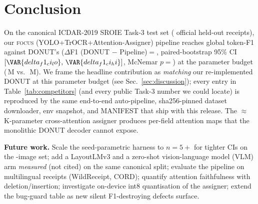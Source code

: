 \section{Conclusion}

On the canonical ICDAR-2019 SROIE Task-3 test set (
official held-out receipts), our \textsc{focus}
(YOLO+TrOCR+Attention-Assigner) pipeline reaches
 global token-F1 against
DONUT's 
($\Delta$F1 (DONUT $-$ Pipeline)$=$,
paired-bootstrap 95\% CI $[\VAR{delta_f1_ci_lo},\,\VAR{delta_f1_ci_hi}]$,
McNemar $p=$) at  the parameter
budget (\,M vs.\
\,M).  We frame the headline contribution as
\emph{matching} our re-implemented DONUT at this parameter budget
(see Sec.~\ref{sec:discussion}); every entry in
Table~\ref{tab:competitors} (and every public Task-3 number we
could locate) is reproduced by the same
end-to-end auto-pipeline, sha256-pinned dataset
downloader, env snapshot, and MANIFEST that ship with this
release.  The
$\approx$\,K-parameter cross-attention
assigner produces per-field attention maps that the monolithic
DONUT decoder cannot expose.

\textbf{Future work.}
Scale the seed-parametric harness to $n{=}5{+}$ for tighter CIs on
the \VAR{n_test_images}-image set; add a LayoutLMv3 and a zero-shot
vision-language model (VLM) arm
\emph{measured} (not cited) on the same canonical split;
evaluate the pipeline on multilingual receipts (WildReceipt, CORD);
quantify attention faithfulness with deletion/insertion; investigate
on-device int8 quantisation of the assigner; extend the bug-guard
table as new silent F1-destroying defects surface.

